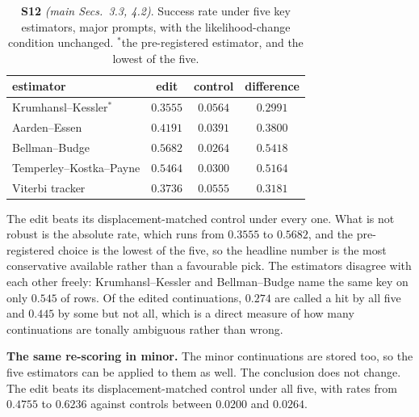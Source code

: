 \documentclass{article}
\begin{document}
\begin{table}[!t]
\centering
\caption{\textbf{S12} \textit{(main Secs.~3.3, 4.2)}. Success rate under five key
estimators, major prompts, with the likelihood-change condition unchanged.
$^{*}$the pre-registered estimator, and the lowest of the five.}
\label{tab:supp-estimators}
\footnotesize
\setlength{\tabcolsep}{4pt}
\begin{tabular}{@{}lccc@{}}
\toprule
estimator & edit & control & difference\\
\midrule
Krumhansl--Kessler$^{*}$ & $0.3555$ & $0.0564$ & $0.2991$\\
Aarden--Essen            & $0.4191$ & $0.0391$ & $0.3800$\\
Bellman--Budge           & $0.5682$ & $0.0264$ & $0.5418$\\
Temperley--Kostka--Payne & $0.5464$ & $0.0300$ & $0.5164$\\
Viterbi tracker          & $0.3736$ & $0.0555$ & $0.3181$\\
\bottomrule
\end{tabular}
\end{table}

The edit beats its displacement-matched control under every one. What is not robust is
the absolute rate, which runs from $0.3555$ to $0.5682$, and the pre-registered choice
is the lowest of the five, so the headline number is the most conservative available
rather than a favourable pick. The estimators disagree with each other freely:
Krumhansl--Kessler and Bellman--Budge name the same key on only $0.545$ of rows. Of the
edited continuations, $0.274$ are called a hit by all five and $0.445$ by some but not
all, which is a direct measure of how many continuations are tonally ambiguous rather
than wrong.

%
\textbf{The same re-scoring in minor.} The minor continuations are stored too, so the
five estimators can be applied to them as well. The conclusion does not change. The edit
beats its displacement-matched control under all five, with rates from $0.4755$ to
$0.6236$ against controls between $0.0200$ and $0.0264$.
\end{document}
